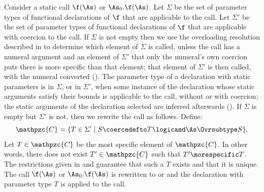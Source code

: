 Consider a static call $\f(\As)$ or $\As_0.\f(\As)$.  Let $\Sigma$ be
the set of parameter types of functional declarations of $\f$ that are
applicable to the call.
Let $\Sigma'$ be the set of parameter types of
functional declarations of $\f$ that are
applicable with coercion to the call.
If $\Sigma$ is not empty then we use the overloading resolution
described in  to determine which
element of $\Sigma$ is called, unless the call has a numeral argument and an
element of $\Sigma'$ that only the numeral's own coercion puts there is more
specific than that element; that element of $\Sigma'$ is then called, with
the numeral converted ().
The parameter type of a declaration with static parameters is in $\Sigma$, or
in $\Sigma'$, when some instance of the declaration whose static arguments
satisfy their bounds is applicable to the call, without or with coercion; the
static arguments of the declaration selected are inferred afterwards
().
If $\Sigma$ is empty but $\Sigma'$ is not, then we rewrite the call as
follows.  Define: \[\mathpzc{C} = \{T \in \Sigma' \mid S \coercedefto T
\logicand \As \Ovrsubtype S\}.\] Let $T \in \mathpzc{C}$ be the most
specific element of $\mathpzc{C}$.  In other words, there does not exist
$T' \in \mathpzc{C}$ such that $T' \morespecific T$.  The restrictions
given in  and
 guarantee that such a $T$
exists and that it is unique.  The call $\f(\As)$ or $\As_0.\f(\As)$ is
rewritten to  or
and the declaration with parameter
type $T$ is applied to the call.

